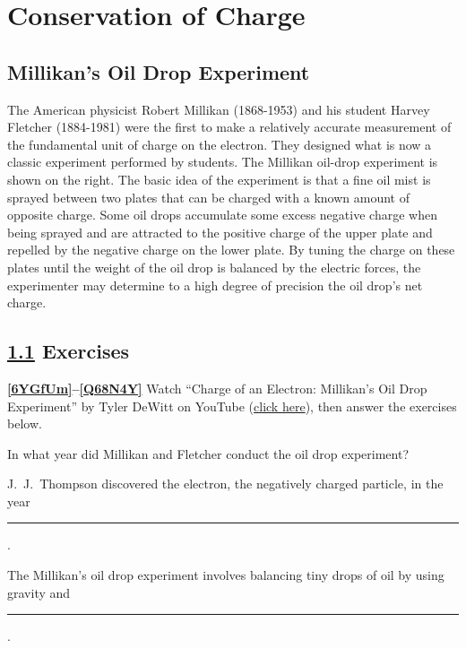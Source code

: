 \documentclass[main.tex]{subfiles}
\begin{document}
\section{Conservation of Charge}


\subsection{Millikan's Oil Drop Experiment} \label{e8Ie5P}

The American physicist Robert Millikan (1868-1953) and his student Harvey Fletcher (1884-1981) were the first to make a relatively accurate measurement of the fundamental unit of charge on the electron. They designed what is now a classic experiment performed by students. The Millikan oil-drop experiment is shown on the right. The basic idea of the experiment is that a fine oil mist is sprayed between two plates that can be charged with a known amount of opposite charge. Some oil drops accumulate some excess negative charge when being sprayed and are attracted to the positive charge of the upper plate and repelled by the negative charge on the lower plate. By tuning the charge on these plates until the weight of the oil drop is balanced by the electric forces, the experimenter may determine to a high degree of precision the oil drop's net charge.


\vspace{1em}
\cyanhrule

\subsection*{\ref{e8Ie5P} Exercises}

\textbf{\ref{6YGfUm}--\ref{Q68N4Y}} Watch ``Charge of an Electron: Millikan's Oil Drop Experiment'' by Tyler DeWitt on YouTube (\href{https://youtu.be/2HhaQtvICe8}{click here}), then answer the exercises below.

\begin{exercise} \label{6YGfUm}
    In what year did Millikan and Fletcher conduct the oil drop experiment?
\end{exercise}

\begin{exercise}
    J.~J.~Thompson discovered the electron, the negatively charged particle, in the year \rule{2cm}{0.15mm}.
\end{exercise}

\begin{exercise}
    The Millikan's oil drop experiment involves balancing tiny drops of oil by using gravity and \rule{2cm}{0.15mm}.
\end{exercise}
\end{document}
